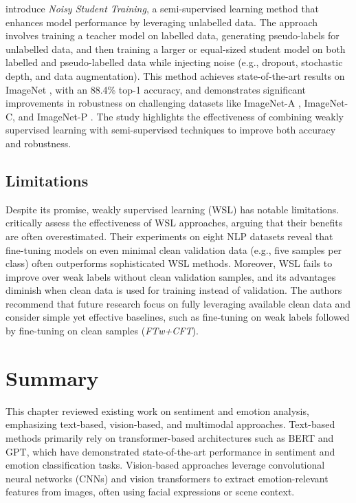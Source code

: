 \citet{xie_self-training_2020} introduce \emph{Noisy Student Training}, a semi-supervised learning method that enhances model performance by leveraging unlabelled data. The approach involves training a teacher model on labelled data, generating pseudo-labels for unlabelled data, and then training a larger or equal-sized student model on both labelled and pseudo-labelled data while injecting noise (e.g., dropout, stochastic depth, and data augmentation). This method achieves state-of-the-art results on ImageNet \cite{5206848}, with an 88.4\% top-1 accuracy, and demonstrates significant improvements in robustness on challenging datasets like ImageNet-A \cite{hendrycks2021naturaladversarialexamples}, ImageNet-C, and ImageNet-P \cite{hendrycks2019benchmarkingneuralnetworkrobustness}. The study highlights the effectiveness of combining weakly supervised learning with semi-supervised techniques to improve both accuracy and robustness.


\subsection*{Limitations}

Despite its promise, weakly supervised learning (WSL) has notable limitations. \citet{zhu_weaker_2023} critically assess the effectiveness of WSL approaches, arguing that their benefits are often overestimated. Their experiments on eight NLP datasets reveal that fine-tuning models on even minimal clean validation data (e.g., five samples per class) often outperforms sophisticated WSL methods. Moreover, WSL fails to improve over weak labels without clean validation samples, and its advantages diminish when clean data is used for training instead of validation. The authors recommend that future research focus on fully leveraging available clean data and consider simple yet effective baselines, such as fine-tuning on weak labels followed by fine-tuning on clean samples (\emph{FTw+CFT}).


\section{Summary}
\label{sec:summary}
This chapter reviewed existing work on sentiment and emotion analysis, emphasizing text-based, vision-based, and multimodal approaches. Text-based methods primarily rely on transformer-based architectures such as BERT and GPT, which have demonstrated state-of-the-art performance in sentiment and emotion classification tasks. Vision-based approaches leverage convolutional neural networks (CNNs) and vision transformers to extract emotion-relevant features from images, often using facial expressions or scene context.
\newline

